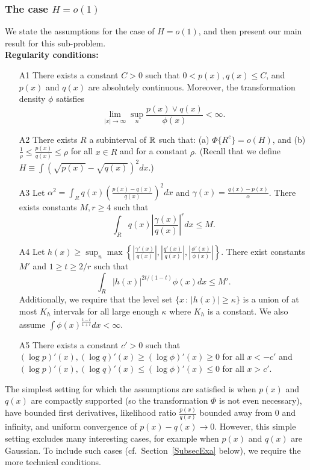 \subsubsection{The case $H = o(1)$}

We state the assumptions for the case of $H = o(1)$, and then present our main result for this sub-problem.\\

\noindent \textbf{Regularity conditions:} 
\begin{enumerate}
\item[A1] There exists a constant $C >0$ such that  $0 < p(x), q(x) \leq C$, and $p(x)$ and $q(x)$ are absolutely continuous.  Moreover, the transformation density $\phi$ satisfies 
$$\lim_{|x| \rightarrow \infty} \sup_n \frac{p(x) \vee q(x)}{\phi(x)} < \infty.$$

\item[A2] There exists $R$ a subinterval of ${\mathbb R}$ such that: (a) $\Phi\{R^c\} = o(H)$, and (b)  $\frac{1}{\rho} \leq \frac{p(x)}{q(x)} \leq \rho $  for all $x \in R$ and for a constant $\rho$. (Recall that we define $H \equiv \int (\sqrt{p(x)} - \sqrt{q(x)})^2 dx$.)

\item[A3] Let $\alpha^2 = \int_R q(x) \left( \frac{p(x) - q(x)}{q(x)} \right)^2 dx$ and $\gamma(x) = \frac{q(x) - p(x)}{\alpha}$. There exists constants $M, r \geq 4$ such that  
$$\int_R q(x) \left| \frac{\gamma(x)}{q(x)} \right|^r dx  \leq M.$$
\item[A4] Let $h(x) \geq \sup_n \max \left\{  \left|\frac{\gamma'(x)}{q(x)} \right|, 
 \left|\frac{q'(x)}{q(x)}\right|, \left| \frac{\phi'(x)}{\phi(x)}\right|  \right\} $. There exist constants $M'$ and $1 \geq t \geq 2/r$ such that
 $$\int_R |h(x)|^{2t/(1-t)} \phi(x) dx \leq M'.$$
Additionally, we require that the level set $\{x \,:\, |h(x)| \geq \kappa\}$ is a union of at most $K_h$ intervals for all large enough $\kappa$ where $K_h$ is a constant. We also assume $\int \phi(x)^{\frac{1-t}{1+t}} dx < \infty$.

\item[A5]  There exists a constant $c' > 0$ such that $(\log p)'(x), (\log q)'(x) \geq (\log \phi)'(x) \geq 0$ for all $x < -c'$ and $ (\log p)'(x), (\log q)'(x) \leq (\log \phi)'(x) \leq 0$ for all $x > c'$.
\end{enumerate}

The simplest setting for which the assumptions are satisfied is when $p(x)$ and $q(x)$ are compactly supported (so the transformation $\Phi$ is not even necessary), have bounded first derivatives, likelihood ratio $\frac{p(x)}{q(x)}$ bounded away from 0 and infinity, and uniform convergence of $p(x) - q(x) \rightarrow 0$. However, this simple setting excludes many interesting cases, for example when $p(x)$ and $q(x)$ are Gaussian. To include such cases (cf.\ Section~\ref{SubsecExa} below), we require the more technical conditions.

